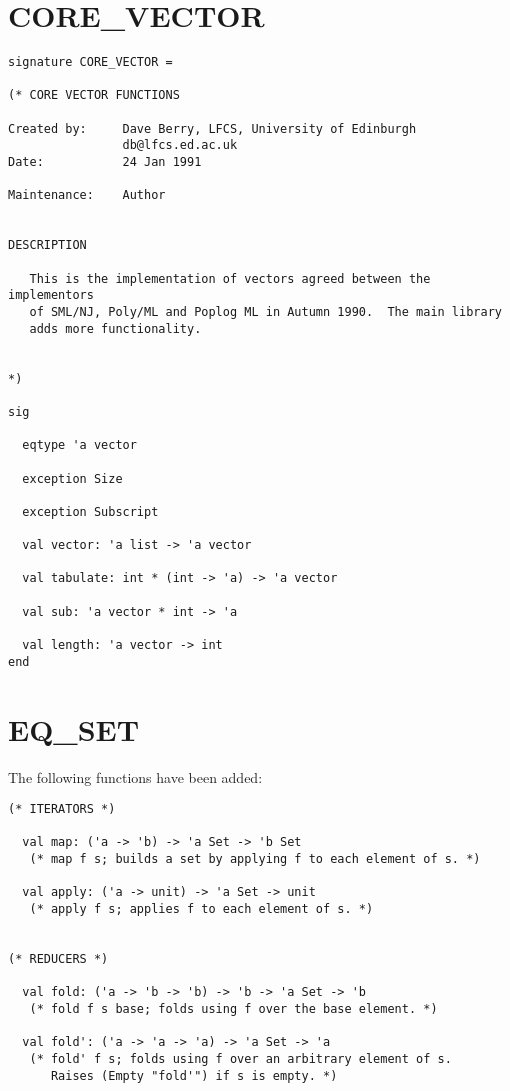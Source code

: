 \section{CORE\_VECTOR}
\begin{verbatim}
signature CORE_VECTOR =

(* CORE VECTOR FUNCTIONS

Created by:     Dave Berry, LFCS, University of Edinburgh
                db@lfcs.ed.ac.uk
Date:           24 Jan 1991

Maintenance:    Author


DESCRIPTION

   This is the implementation of vectors agreed between the implementors
   of SML/NJ, Poly/ML and Poplog ML in Autumn 1990.  The main library
   adds more functionality.


*)

sig

  eqtype 'a vector

  exception Size

  exception Subscript

  val vector: 'a list -> 'a vector

  val tabulate: int * (int -> 'a) -> 'a vector

  val sub: 'a vector * int -> 'a

  val length: 'a vector -> int
end
\end{verbatim}

\newpage
\section{EQ\_SET}
The following functions have been added:
\begin{verbatim}
(* ITERATORS *)

  val map: ('a -> 'b) -> 'a Set -> 'b Set
   (* map f s; builds a set by applying f to each element of s. *)

  val apply: ('a -> unit) -> 'a Set -> unit
   (* apply f s; applies f to each element of s. *)


(* REDUCERS *)

  val fold: ('a -> 'b -> 'b) -> 'b -> 'a Set -> 'b
   (* fold f s base; folds using f over the base element. *)

  val fold': ('a -> 'a -> 'a) -> 'a Set -> 'a
   (* fold' f s; folds using f over an arbitrary element of s.
      Raises (Empty "fold'") if s is empty. *)
\end{verbatim}


\newpage
